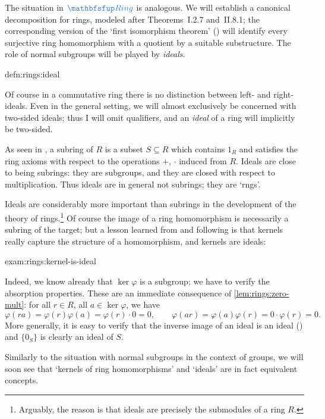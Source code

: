 The situation in $\categ{Ring}$ is analogous. We will establish a
canonical decomposition for rings, modeled after Theorems~I.2.7
and~II.8.1; the corresponding version of the `first isomorphism
theorem' () will identify
every surjective ring homomorphism with a quotient by a suitable
substructure. The role of normal subgroups will be played by
\emph{ideals}.
\begin{defn}{}{defn:rings:ideal}
\end{defn}
Of course in a commutative ring there is no distinction between left-
and right-ideals. Even in the general setting, we will almost
exclusively be concerned with two-sided ideals; thus I will omit
qualifiers, and an \emph{ideal} of a ring will implicitly be
two-sided.
\begin{rem}{}{}
  As seen in , a
  subring of $R$ is a subset $S \subseteq R$ which contains $1_R$ and
  satisfies the ring axioms with respect to the operations $+$,
  $\cdot$ induced from $R$. Ideals are close to being subrings: they
  are subgroups, and they are closed with respect to
  multiplication.  Thus ideals are in
  general not subrings; they are `rngs'.
\end{rem}
Ideals are considerably more important than subrings in the
development of the theory of rings.\footnote{Arguably, the reason is
  that ideals are precisely the submodules of a ring $R$.} Of course
the image of a ring homomorphism is necessarily a subring of the
target; but a lesson learned from
 and following is that
kernels really capture the structure of a homomorphism, and kernels
are ideals:
\begin{exam}{}{exam:rings:kernel-is-ideal}

  Indeed, we know already that $\ker \varphi$ is a subgroup; we have
  to verify the absorption properties. These are an immediate
  consequence of \cref{lem:rings:zero-mult}: for all $r \in R$, all
  $a \in \ker \varphi$, we have
  \[
    \varphi(ra) = \varphi(r)\varphi(a) = \varphi(r) \cdot 0 = 0,
    \qquad \varphi(ar) = \varphi(a)\varphi(r) = 0 \cdot \varphi(r) =
    0.
  \]
  More generally, it is easy to verify that the inverse image of an
  ideal is an ideal () and $\{0_S\}$
  is clearly an ideal of $S$.

  Similarly to the situation with normal subgroups in the context of
  groups, we will soon see that `kernels of ring homomorphisms' and
  `ideals' are in fact equivalent concepts.
\end{exam}

